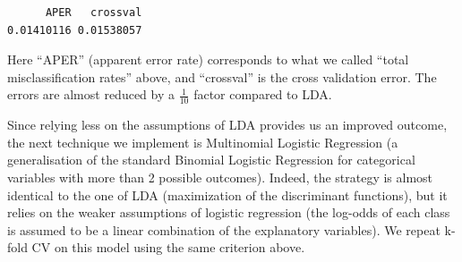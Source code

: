 \documentclass[
  letterpaper,
  DIV=11,
  numbers=noendperiod]{scrartcl}
\newenvironment{Shaded}{\begin{snugshade}}{\end{snugshade}}
\newcommand{\AttributeTok}[1]{\textcolor[rgb]{0.40,0.45,0.13}{#1}}
\newcommand{\ConstantTok}[1]{\textcolor[rgb]{0.56,0.35,0.01}{#1}}
\newcommand{\DecValTok}[1]{\textcolor[rgb]{0.68,0.00,0.00}{#1}}
\newcommand{\FunctionTok}[1]{\textcolor[rgb]{0.28,0.35,0.67}{#1}}
\newcommand{\NormalTok}[1]{\textcolor[rgb]{0.00,0.23,0.31}{#1}}
\newcommand{\OtherTok}[1]{\textcolor[rgb]{0.00,0.23,0.31}{#1}}
\newcommand{\SpecialCharTok}[1]{\textcolor[rgb]{0.37,0.37,0.37}{#1}}
\begin{document}
\begin{Shaded}
\end{Shaded}

\begin{verbatim}
      APER   crossval 
0.01410116 0.01538057 
\end{verbatim}

Here ``APER'' (apparent error rate) corresponds to what we called
``total misclassification rates'' above, and ``crossval'' is the cross
validation error. The errors are almost reduced by a \(\frac{1}{10}\)
factor compared to LDA.

Since relying less on the assumptions of LDA provides us an improved
outcome, the next technique we implement is Multinomial Logistic
Regression (a generalisation of the standard Binomial Logistic
Regression for categorical variables with more than 2 possible
outcomes). Indeed, the strategy is almost identical to the one of LDA
(maximization of the discriminant functions), but it relies on the
weaker assumptions of logistic regression (the log-odds of each class is
assumed to be a linear combination of the explanatory variables). We
repeat k-fold CV on this model using the same criterion above.
\end{document}

